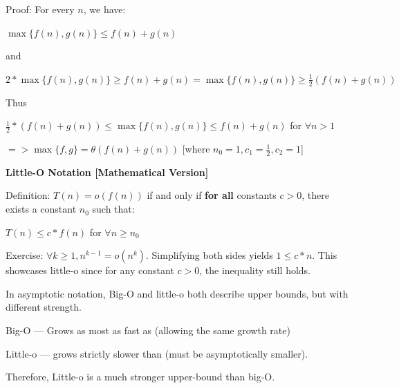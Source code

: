 \documentclass[11pt]{article}
\begin{document}
Proof: For every $n$, we have:

\vspace{11pt}
\begin{center}
    $\max\{f(n),g(n)\} \leq f(n)+g(n) $
\end{center}
\vspace{11pt}

and

\vspace{11pt}
\begin{center}
    $2*\max\{f(n),g(n)\} \geq f(n)+g(n) = \max\{f(n),g(n)\} \geq \frac12(f(n)+g(n))$
\end{center}
\vspace{11pt}

Thus

\vspace{11pt}
\begin{center}
    $\frac12 * (f(n)+g(n)) \leq \max\{f(n),g(n)\} \leq f(n)+g(n)$ for $\forall n > 1$

    $=> \max\{f,g\} = \theta(f(n)+g(n))$ [where $n_0=1,c_1=\frac12,c_2=1$]
\end{center}
\vspace{11pt}

\textbf{Little-O Notation [Mathematical Version]}
\vspace{11pt}

Definition: $T(n)=o(f(n))$ if and only if \textbf{for all} constants $c>0$, there exists a constant $n_0$ such that:

\vspace{11pt}
\begin{center}
    $T(n) \leq c * f(n)$ for $\forall n \geq n_0$
\end{center}
\vspace{11pt}

Exercise: $\forall k \geq1,n^{k-1}=o(n^k)$. Simplifying both sides yields $1 \leq c*n$. This showcases little-o since for any constant $c>0$, the inequality still holds.

\vspace{11pt}
In asymptotic notation, Big-O and little-o both describe upper bounds, but with different strength.

Big-O --- Grows as most as fast as (allowing the same growth rate)

Little-o --- grows strictly slower than (must be asymptotically smaller).

Therefore, Little-o is a much stronger upper-bound than big-O.
\end{document}
